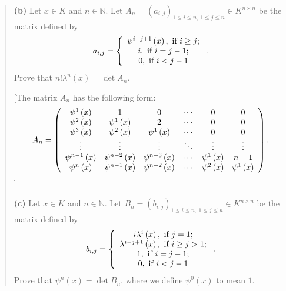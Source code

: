 \documentclass[numbers=enddot,12pt,final,onecolumn,notitlepage]{scrartcl}%
\begin{document}
\begin{quotation}
\textbf{(b)} Let $x\in K$ and $n\in\mathbb{N}$. Let $A_{n}=\left(
a_{i,j}\right)  _{1\leq i\leq n,\ 1\leq j\leq n}\in K^{n\times n}$ be the
matrix defined by%
\[
a_{i,j}=\left\{
\begin{array}
[c]{c}%
\psi^{i-j+1}\left(  x\right)  ,\text{ if }i\geq j;\\
i,\text{ if }i=j-1;\\
0,\text{ if }i<j-1
\end{array}
\right.  .
\]
Prove that $n!\lambda^{n}\left(  x\right)  =\det A_{n}$.

[The matrix $A_{n}$ has the following form:%
\[
A_{n}=\left(
\begin{array}
[c]{cccccc}%
\psi^{1}\left(  x\right)  & 1 & 0 & \cdots & 0 & 0\\
\psi^{2}\left(  x\right)  & \psi^{1}\left(  x\right)  & 2 & \cdots & 0 & 0\\
\psi^{3}\left(  x\right)  & \psi^{2}\left(  x\right)  & \psi^{1}\left(
x\right)  & \cdots & 0 & 0\\
\vdots & \vdots & \vdots & \ddots & \vdots & \vdots\\
\psi^{n-1}\left(  x\right)  & \psi^{n-2}\left(  x\right)  & \psi^{n-3}\left(
x\right)  & \cdots & \psi^{1}\left(  x\right)  & n-1\\
\psi^{n}\left(  x\right)  & \psi^{n-1}\left(  x\right)  & \psi^{n-2}\left(
x\right)  & \cdots & \psi^{2}\left(  x\right)  & \psi^{1}\left(  x\right)
\end{array}
\right)  .
\]
]

\textbf{(c)} Let $x\in K$ and $n\in\mathbb{N}$. Let $B_{n}=\left(
b_{i,j}\right)  _{1\leq i\leq n,\ 1\leq j\leq n}\in K^{n\times n}$ be the
matrix defined by%
\[
b_{i,j}=\left\{
\begin{array}
[c]{c}%
i\lambda^{i}\left(  x\right)  ,\text{ if }j=1;\\
\lambda^{i-j+1}\left(  x\right)  ,\text{ if }i\geq j>1;\\
1,\text{ if }i=j-1;\\
0,\text{ if }i<j-1
\end{array}
\right.  .
\]
Prove that $\psi^{n}\left(  x\right)  =\det B_{n}$, where we define $\psi
^{0}\left(  x\right)  $ to mean $1$.


\end{quotation}
\end{document}
